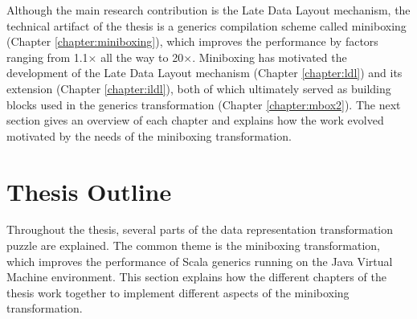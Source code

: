 
Although the main research contribution is the Late Data Layout mechanism, the technical artifact of the thesis is a generics compilation scheme called miniboxing (Chapter \ref{chapter:miniboxing}), which improves the performance by factors ranging from 1.1$\times$ all the way to 20$\times$. Miniboxing has motivated the development of the Late Data Layout mechanism (Chapter \ref{chapter:ldl}) and its extension (Chapter \ref{chapter:ildl}), both of which ultimately served as building blocks used in the generics transformation (Chapter \ref{chapter:mbox2}). The next section gives an overview of each chapter and explains how the work evolved motivated by the needs of the miniboxing transformation.

\section{Thesis Outline}

Throughout the thesis, several parts of the data representation transformation puzzle are explained. The common theme is the miniboxing transformation, which improves the performance of Scala generics running on the Java Virtual Machine environment. This section explains how the different chapters of the thesis work together to implement different aspects of the miniboxing transformation.

%


